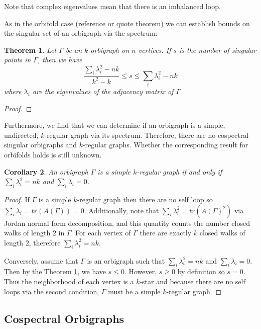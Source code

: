 \documentclass[12pt]{article}
\theoremstyle{plain}
\newtheorem{theorem}{Theorem}
\newtheorem{corollary}[theorem]{Corollary}
\theoremstyle{definition}
\theoremstyle{remark}
\begin{document}
    Note that complex eigenvalues mean that there is an imbalanced loop.

    As in the orbifold case (reference or quote theorem) we can establish bounds on the singular set of an orbigraph via the spectrum:

    \begin{theorem}\label{thm:SingularBounds}
      Let $\Gamma$ be an $k$-orbigraph on $n$ vertices. If $s$ is the number of singular points in $\Gamma$, then we have
      $$
        \frac{\sum_{i} \lambda_i^2 - n k}{k^2 - k} \le s \le \sum_{i} \lambda_i^2 - n k
      $$
      where $\lambda_i$ are the eigenvalues of the adjacency matrix of $\Gamma$
    \end{theorem}
    \begin{proof}
      
    \end{proof}

    Furthermore, we find that we can determine if an orbigraph is a simple, undirected, $k$-regular graph via its spectrum. Therefore, there are no cospectral singular orbigraphs and $k$-regular graphs. Whether the corresponding result for orbifolds holds is still unknown.

    \begin{corollary}
      An orbigraph $\Gamma$ is a simple $k$-regular graph if and only if $\sum_{i} \lambda_i^2 = n k$ and $\sum_{i} \lambda_i = 0$.
    \end{corollary}
    \begin{proof}
      If $\Gamma$ is a simple $k$-regular graph then there are no self loop so $\sum_{i} \lambda_i = tr(A(\Gamma)) = 0$. Additionally, note that $\sum_{i} \lambda_i^2 = tr(A(\Gamma)^2)$ via Jordan normal form decomposition, and this quantity counts the number closed walks of length $2$ in $\Gamma$. For each vertex of $\Gamma$ there are exactly $k$ closed walks of length $2$, therefore $\sum_{i} \lambda_i^2 = n k$. 

      Conversely, assume that $\Gamma$ is an orbigraph such that $\sum_{i} \lambda_i^2 = n k$ and $\sum_{i} \lambda_i = 0$. Then by the Theorem \ref{thm:SingularBounds}, we have $s \le 0$. However, $s \ge 0$ by definition so $s = 0$. Thus the neighborhood of each vertex is a $k$-star and because there are no self loops via the second condition, $\Gamma$ must be a simple $k$-regular graph.
    \end{proof}


  \subsection{Cospectral Orbigraphs}
\end{document}
